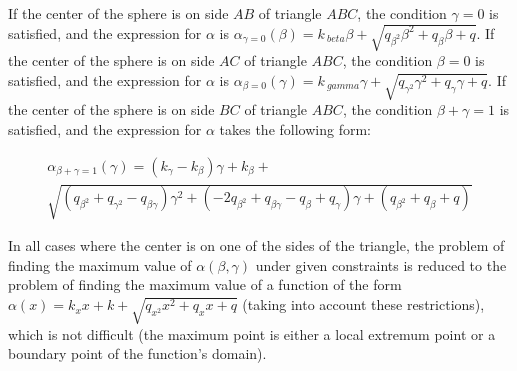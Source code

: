 \documentclass[
11pt,%
tightenlines,%
twoside,%
onecolumn,%
nofloats,%
nobibnotes,%
nofootinbib,%
superscriptaddress,%
noshowpacs,%
centertags]%
{revtex4-2}
\begin{document}
If the center of the sphere is on side $AB$ of triangle $ABC$, the condition $\gamma = 0$ is satisfied, and the expression for $\alpha$ is $\alpha_{\gamma = 0}(\beta) = k_{\ beta} \beta + \sqrt{q_{\beta^2} \beta^2 + q_{\beta} \beta + q}$.
If the center of the sphere is on side $AC$ of triangle $ABC$, the condition $\beta = 0$ is satisfied, and the expression for $\alpha$ is $\alpha_{\beta = 0}(\gamma) = k_{\ gamma} \gamma + \sqrt{q_{\gamma^2} \gamma^2 + q_{\gamma} \gamma + q}$.
If the center of the sphere is on side $BC$ of triangle $ABC$, the condition $\beta + \gamma = 1$ is satisfied, and the expression for $\alpha$ takes the following form:

\begin{multline}
\alpha_{\beta + \gamma = 1}(\gamma) = (k_{\gamma} - k_{\beta}) \gamma + k_{\beta} + \\
\sqrt{(q_{\beta^2} + q_{\gamma^2} - q_{\beta \gamma}) \gamma^2 + (-2 q_{\beta^2} + q_{\beta \gamma} - q_{\beta} + q_{\gamma}) \gamma + (q_{\beta^2} + q_{\beta} + q)}
\end{multline}

In all cases where the center is on one of the sides of the triangle, the problem of finding the maximum value of $\alpha(\beta, \gamma)$ under given constraints is reduced to the problem of finding the maximum value of a function of the form $\alpha(x) = k_x x + k + \sqrt {q_{x^2} x^2 + q_x x + q}$ (taking into account these restrictions), which is not difficult (the maximum point is either a local extremum point or a boundary point of the function's domain).
\end{document}
